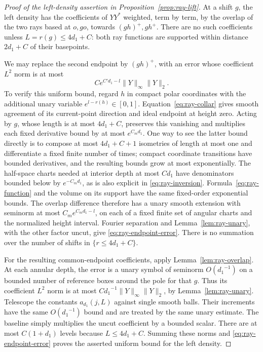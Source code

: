 \begin{proof}[Proof of the left-density assertion in
Proposition~\ref{prop:ray-lift}]
At a shift \(g\), the left density has the coefficients of \(YY^*\)
weighted, term by term, by the overlap of the two rays based at
\(o,go\), towards \((gh)^+,gh^+\).  There are no such coefficients
unless \(L=r(g)\le4{d_1}+C\): both ray functions are supported within
distance \(2{d_1}+C\) of their basepoints.

We may replace the second endpoint by \((gh)^+\), with an error
whose coefficient \(L^2\) norm is at most
\begin{equation}\label{eq:ray-endpoint-error}
 C e^{C'{d_1}-l}\|Y\|_\infty\|Y\|_2.
\end{equation}
To verify this uniform bound, regard \(h\) in compact polar coordinates
with the additional unary variable \(e^{l-r(h)}\in[0,1]\).
Equation~\eqref{eq:ray-collar} gives smooth agreement of its
current-point direction and ideal endpoint at height zero.
Acting by \(g\), whose length is at most \(4{d_1}+C\), preserves this
vanishing and multiplies each fixed derivative bound by at most
\(e^{C_m {d_1}}\).  One way to see the latter bound directly is to
compose at most \(4{d_1}+C+1\) isometries of length at most one and
differentiate a fixed finite number of times; compact coordinate
transitions have bounded derivatives, and the resulting bounds grow
at most exponentially.  The half-space charts needed at interior
depth at most \(C d_1\) have denominators bounded below by
\(e^{-C_m {d_1}}\), as is also explicit in
\eqref{eq:ray-inversion}.  Formula~\eqref{eq:ray-function}
and the volume on its support have the same fixed-order exponential
bounds.  The overlap difference therefore has a unary smooth
extension with seminorm at most \(C_m e^{C_m {d_1}-l}\), on each of a
fixed finite set of angular charts and the normalized height
interval.  Fourier separation and
Lemma~\ref{lem:ray-unary}, with the other factor uncut,
give \eqref{eq:ray-endpoint-error}.  There is no summation
over the number of shifts in \(\{r\le4{d_1}+C\}\).

For the resulting common-endpoint coefficients, apply
Lemma~\ref{lem:ray-overlap}.  At each annular depth, the
error is a unary symbol of seminorm \(O({d_1}^{-1})\) on a bounded
number of reference boxes around the pole for that \(g\).  Thus its
coefficient \(L^2\) norm is at most
\(C{d_1}^{-1}\|Y\|_\infty\|Y\|_2\), by
Lemma~\ref{lem:ray-unary}.  Telescope the constants
\(a_{d_1}(j,L)\) against single smooth balls.  Their increments have
the same \(O({d_1}^{-1})\) bound and are treated by the same unary
estimate.  The baseline simply multiplies the uncut coefficient by
a bounded scalar.  There are at most \(C(1+{d_1})\) levels because
\(L\le4{d_1}+C\).  Summing these norms and
\eqref{eq:ray-endpoint-error} proves the asserted uniform
bound for the left density.


\end{proof}
